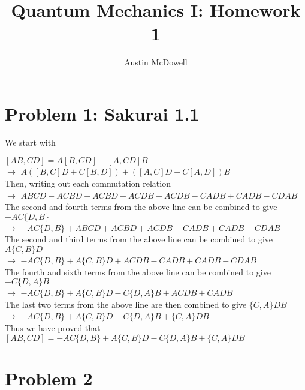 \documentclass[11pt]{article}
\title{Quantum Mechanics I: Homework 1}
\author{Austin McDowell}
\begin{document}
\maketitle

\section{Problem 1: Sakurai 1.1}

We start with

$[AB, CD] = A[B, CD] + [A, CD]B$ \\
$\rightarrow$ $A([B,C]D + C[B,D]) + ([A,C]D+C[A,D])B$ \\
Then, writing out each commutation relation \\
$\rightarrow$ $ABCD-ACBD+ACBD-ACDB+ACDB-CADB+CADB-CDAB$ \\
The second and fourth terms from the above line can be combined to give $-AC\{D,B\}$ \\
$\rightarrow$ $-AC\{D,B\} + ABCD + ACBD +ACDB-CADB+CADB-CDAB$ \\
The second and third terms from the above line can be combined to give $A\{C,B\}D$ \\
$\rightarrow$ $-AC\{D,B\} + A\{C,B\}D +ACDB-CADB+CADB-CDAB$ \\
The fourth and sixth terms from the above line can be combined to give $-C\{D,A\}B$ \\
$\rightarrow$ $-AC\{D,B\} + A\{C,B\}D - C\{D,A\}B +ACDB+CADB$ \\
The last two terms from the above line are then combined to give $\{C,A\}DB$ \\
$\rightarrow$ $-AC\{D,B\} + A\{C,B\}D - C\{D,A\}B + \{C,A\}DB$ \\
Thus we have proved that \\
$\boxed{[AB, CD] = -AC\{D,B\} + A\{C,B\}D - C\{D,A\}B + \{C,A\}DB}$ \\


\section{Problem 2}
\end{document}
